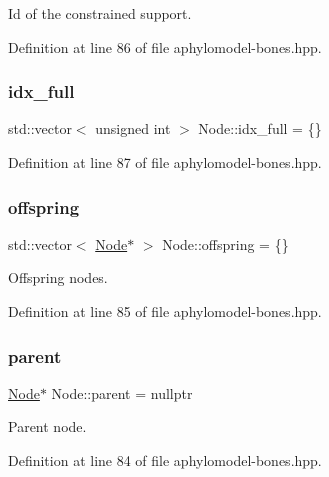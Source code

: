 Id of the constrained support. 



Definition at line 86 of file aphylomodel-\/bones.\+hpp.

\mbox{\label{class_node_a33e1dede84aea9685dfad5c0b3baeea7}} 
\subsubsection{\texorpdfstring{idx\+\_\+full}{idx\_full}}
{\footnotesize\ttfamily std\+::vector$<$ unsigned int $>$ Node\+::idx\+\_\+full = \{\}}



Definition at line 87 of file aphylomodel-\/bones.\+hpp.

\mbox{\label{class_node_a4e7e9c69da2575cad9c5fb7865dd42c7}} 
\subsubsection{\texorpdfstring{offspring}{offspring}}
{\footnotesize\ttfamily std\+::vector$<$ \hyperlink{class_node}{Node}$\ast$ $>$ Node\+::offspring = \{\}}



Offspring nodes. 



Definition at line 85 of file aphylomodel-\/bones.\+hpp.

\mbox{\label{class_node_ad8184598cdea70e4bbdfd76f2b0f9e85}} 
\subsubsection{\texorpdfstring{parent}{parent}}
{\footnotesize\ttfamily \hyperlink{class_node}{Node}$\ast$ Node\+::parent = nullptr}



Parent node. 



Definition at line 84 of file aphylomodel-\/bones.\+hpp.

\mbox{\label{class_node_a479513290e6e83b8715f3075dd289ff4}} 
